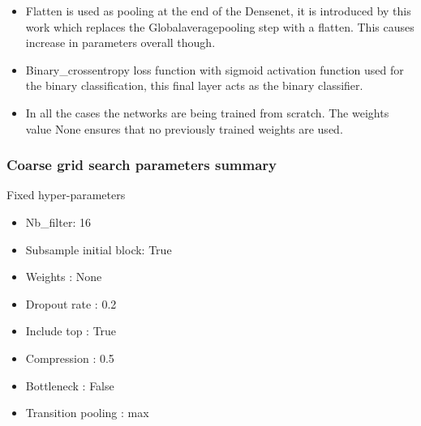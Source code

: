 \begin{itemize}
 \item Flatten is used as pooling at the end of the Densenet, it is introduced by this work which replaces the Globalaveragepooling step with a flatten. This causes increase 
 in parameters overall though.
 \item Binary\_crossentropy loss function with sigmoid activation function used for the binary classification, this final layer acts as the binary classifier.
 \item In all the cases the networks are being trained from scratch. The weights value None ensures that no previously trained weights are used.
\end{itemize}

\subsubsection{Coarse grid search parameters summary}
\begin{flushleft} {Fixed hyper-parameters}
\begin{itemize}
 \item Nb\_filter: 16
 \item Subsample initial block: True
 \item Weights : None
 \item Dropout rate : 0.2
 \item Include top : True
 \item Compression : 0.5
 \item Bottleneck : False
 \item Transition pooling : max
\end{itemize}
\end{flushleft}

